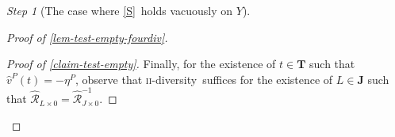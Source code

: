\documentclass[ecta,nameyear,draft]{econsocart}
\newcommand{\R}{\mathbb R}
\newcommand{\novel}{\mathfrak f}
\newcommand{\hext}{\mathrel{\hat{\mathrel{\mathcal R}}}}
\newcommand{\aext}{\mathrel{\acute{\mathrel{\mathcal R}}}}
\newcommand{\aextb}{\mathbin{\acute{\mathbin{\mathcal R}}}}
\newcommand{\mbbc}{{\mathbf C}}
\newcommand{\mbbt}{{\mathbf {T}}}
\newcommand{\mbbj}{\mathbf J}
\newcommand{\xy}{{(x, y)}}
\newcommand{\stability}{\ref{S}}
\newcommand{\twodiv}{\textsc{ii}-\textup{diversity}}
\theoremstyle{plain}
\theoremstyle{remark}
\newtheorem{step}{Step}[section]
\begin{document}
\begin{appendix}
\begin{step}[The case where \stability\ holds vacuously on $Y$]
\begin{proof}[Proof of \cref{lem-test-empty-fourdiv}]
\begin{proof}[Proof of \cref{claim-test-empty}]
        Finally, for the existence of $t\in\mbbt$ such that $\hat{v}^{P}(t) =
        -\eta^{P}$, observe that \twodiv\ suffices for the existence of $L \in
        \mbbj$ such that $\hext_{L\times 0} = \hext_{J\times 0}^{-1}$.
      \end{proof}


\end{proof}
\end{step}
\end{appendix}
\end{document}
